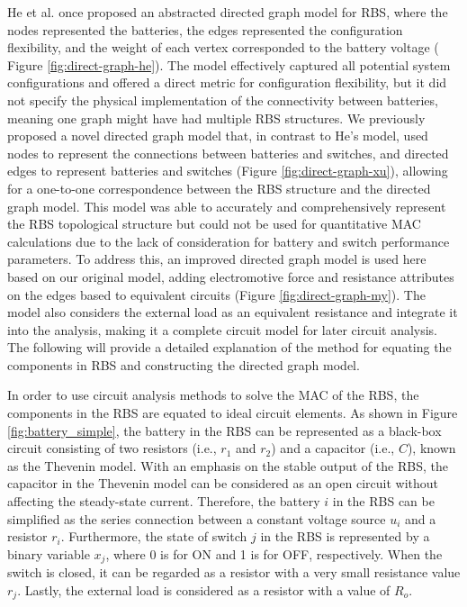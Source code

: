 \documentclass{article}
\begin{document}
He et al. \cite{heExploringAdaptiveReconfiguration2013} once proposed an abstracted directed graph model for RBS, where the nodes represented the batteries, the edges represented the configuration flexibility, and the weight of each vertex corresponded to the battery voltage ( Figure \ref{fig:direct-graph-he}). 
The model effectively captured all potential system configurations and offered a direct metric for configuration flexibility, but it did not specify the physical implementation of the connectivity between batteries, meaning one graph might have had multiple RBS structures.
We previously proposed a novel directed graph model that, in contrast to He's model, used nodes to represent the connections between batteries and switches, and directed edges to represent batteries and switches (Figure \ref{fig:direct-graph-xu}), allowing for a one-to-one correspondence between the RBS structure and the directed graph model. 
This model was able to accurately and comprehensively represent the RBS topological structure but could not be used for quantitative MAC calculations due to the lack of consideration for battery and switch performance parameters. 
To address this, an improved directed graph model is used here based on our original model, adding electromotive force and resistance attributes on the edges based to equivalent circuits (Figure \ref{fig:direct-graph-my}).
The model also considers the external load as an equivalent resistance and integrate it into the analysis, making it a complete circuit model for later circuit analysis.
The following will provide a detailed explanation of the method for equating the components in RBS and constructing the directed graph model.


In order to use circuit analysis methods to solve the MAC of the RBS, the components in the RBS are equated to ideal circuit elements.
As shown in Figure \ref{fig:battery_simple}, the battery in the RBS can be represented as a black-box circuit consisting of two resistors (i.e., $r_1$ and $r_2$) and a capacitor (i.e., $C$), known as the Thevenin model\cite{hongwenheStateofChargeEstimationLithiumIon2011,mousavig.VariousBatteryModels2014}.
With an emphasis on the stable output of the RBS, the capacitor in the Thevenin model can be considered as an open circuit without affecting the steady-state current.
Therefore, the battery $i$ in the RBS can be simplified as the series connection between a constant voltage source $u_{i}$ and a resistor $r_{i}$.
Furthermore, the state of switch $j$ in the RBS is represented by a binary variable $x_j$, where 0 is for ON and 1 is for OFF, respectively.
When the switch is closed, it can be regarded as a resistor with a very small resistance value $r_{j}$.
Lastly, the external load is considered as a resistor with a value of $R_o$.
\end{document}
